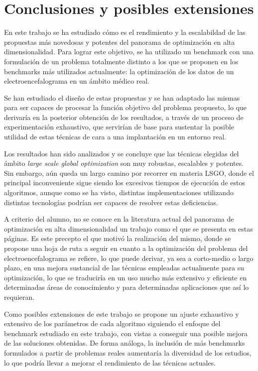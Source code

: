 \chapter{Conclusiones y posibles extensiones}\label{cap:Conclusiones}

En este trabajo se ha estudiado cómo es el rendimiento y la escalabildad de las propuestas más novedosas y potentes del panorama de optimización en alta dimensionalidad. Para lograr este objetivo, se ha utilizado un benchmark con una formulación de un problema totalmente distinto a los que se proponen en los benchmarks más utilizados actualmente: la optimización de los datos de un electroencefalograma en un ámbito médico real.

Se han estudiado el diseño de estas propuestas y se han adaptado las mismas para ser capaces de procesar la función objetivo del problema propuesto, lo que derivaría en la posterior obtención de los resultados, a través de un proceso de experimentación exhaustivo, que servirían de base para sustentar la posible utilidad de estas técnicas de cara a una implantación en un entorno real.

Los resultados han sido analizados y se concluye que las técnicas elegidas del ámbito \textit{large scale global optimization} son muy robustas, escalables y potentes. Sin embargo, aún queda un largo camino por recorrer en materia LSGO, donde el principal inconveniente sigue siendo los excesivos tiempos de ejecución de estos algoritmos, aunque como se ha visto, distintas implementaciones utilizando distintas tecnologías podrían ser capaces de resolver estas deficiencias.

A criterio del alumno, no se conoce en la literatura actual del panorama de optimización en alta dimensionalidad un trabajo como el que se presenta en estas páginas. Es este precepto el que motivó la realización del mismo, donde se propone una hoja de ruta a seguir en cuanto a la optimización del problema del electroencefalograma se refiere, lo que puede derivar, ya sea a corto-medio o largo plazo, en una mejora sustancial de las técnicas empleadas actualmente para su optimización, lo que se traduciría en un uso mucho más extensivo y eficiente en determinadas áreas de conocimiento y para determinadas aplicaciones que así lo requieran.

Como posibles extensiones de este trabajo se propone un ajuste exhaustivo y extensivo de los parámetros de cada algoritmo siguiendo el enfoque del benchmark estudiado en este trabajo, con vistas a conseguir una posible mejora de las soluciones obtenidas. De forma análoga, la inclusión de más benchmarks formulados a partir de problemas reales aumentaría la diversidad de los estudios, lo que podría llevar a mejorar el rendimiento de las técnicas actuales.

